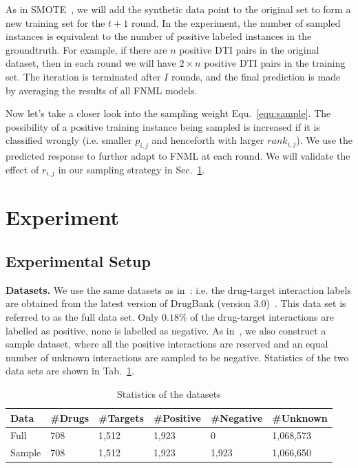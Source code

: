 \documentclass[journal]{IEEEtran}
\begin{document}
As in SMOTE~\cite{SMOTE}, we will add the synthetic data point to the original set to form a new training set for the $t+1$ round. In the experiment, the number of sampled instances is equivalent to the number of positive labeled instances in the groundtruth. For example, if there are $n$ positive DTI pairs in the original dataset, then in each round we will have $2\times n$ positive DTI pairs in the training set. The iteration is terminated after $I$ rounds, and the final prediction is made by averaging the results of all FNML models. 

Now let's take a closer look into the sampling weight Equ.~\ref{equ:sample}. The possibility of a positive training instance being sampled is increased if it is classified wrongly (i.e. smaller $p_{i,j}$ and henceforth with larger $rank_{i,j}$). We use the predicted response to further adapt to FNML at each round. We will validate the effect of $r_{i,j}$ in our sampling strategy in Sec.~\ref{sec:experiment}. 

\section{Experiment}\label{sec:experiment}
\subsection{Experimental Setup}


\textbf{Datasets.} 
We use the same datasets as in~\cite{Luo2017Network}: i.e. the drug-target interaction labels are obtained from the latest version of DrugBank (version 3.0)~\cite{Knox2011DrugBank}. This data set is referred to as the full data set. Only $0.18\%$ of the drug-target interactions are labelled as positive, none is labelled as negative. As in~\cite{Luo2017Network}, we also construct a sample dataset, where all the positive interactions are reserved and an equal number of unknown interactions are sampled to be negative. Statistics of the two data sets are shown in Tab.~\ref{tab:data}. 
\begin{table}[htp]
\caption{Statistics of the datasets}\label{tab:data}
\center
\vspace*{-10pt}
\small
\begin{tabular}{|p{0.8cm}|p{0.8cm}|p{0.9cm}|p{1cm}|p{1.2cm}|p{1.2cm}|}
%
\hline
Data & \#Drugs & \#Targets & \#Positive & \#Negative & \#Unknown \\\hline
Full & 708 & 1,512 & 1,923 & 0 & 1,068,573 \\\hline
Sample & 708 & 1,512 & 1,923 & 1,923 & 1,066,650 \\\hline
\end{tabular}
\vspace*{-5pt}
\end{table}%
\end{document}
